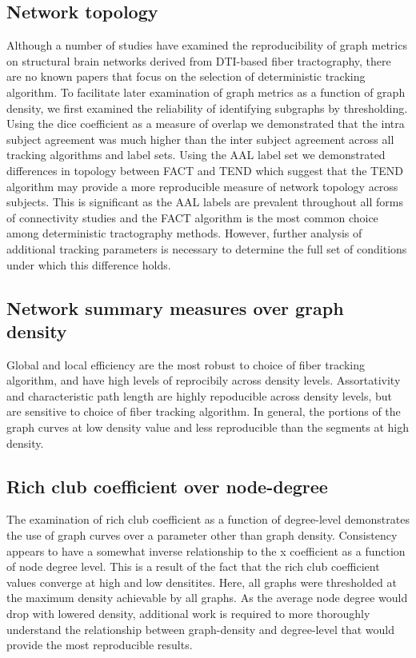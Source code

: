 \documentclass{frontiersSCNS} %
\begin{document}



\subsection{Network topology}
Although a number of studies have examined the reproducibility of graph metrics on 
structural brain networks derived from DTI-based fiber tractography, there are no known 
papers that focus on the selection of deterministic tracking algorithm. To facilitate later examination of
graph metrics as a function of graph density, we first examined the reliability of identifying
subgraphs by thresholding. Using the dice coefficient as a measure of overlap we demonstrated
that the intra subject agreement was much higher than the inter subject agreement across all tracking algorithms and 
label sets. Using the AAL label set we demonstrated differences in topology between FACT and TEND which suggest
that the TEND algorithm may provide a more reproducible measure of network topology across subjects. This is significant as the AAL
labels are prevalent throughout all forms of connectivity studies and the FACT algorithm is the most common choice
among deterministic tractography methods. However, further analysis of additional tracking parameters is 
necessary to determine the full set of conditions under which this difference holds.

\subsection{Network summary measures over graph density}
Global and local efficiency are the most robust to choice of fiber tracking algorithm, and have high levels 
of reprocibily across density levels. Assortativity and characteristic path length are highly repoducible across
density levels, but are sensitive to choice of fiber tracking algorithm. In general, the portions of the graph curves
at low density value and less reproducible than the segments at high density. 

\subsection{Rich club coefficient over node-degree}
The examination of rich club coefficient as a function of degree-level demonstrates the use of graph curves over 
a parameter other than graph density. Consistency appears to have a somewhat inverse relationship to the x
coefficient as a function of node degree level. This is a result of the fact that the rich club coefficient values converge
at high and low densitites. Here, all graphs were thresholded at the maximum density achievable by all graphs. As the average node degree would drop with lowered
density, additional work is required to more thoroughly understand the relationship between graph-density and degree-level that 
would provide the most reproducible results. 
\end{document}
